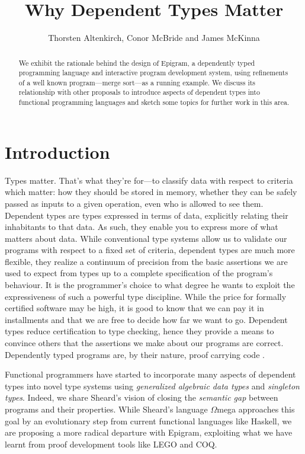 \documentclass{fundam}
\begin{document}
\title{Why Dependent Types Matter}
\author{Thorsten Altenkirch, Conor McBride and James McKinna}
\maketitle

\begin{abstract}
  We exhibit the rationale behind the design of Epigram, a dependently
  typed programming language and interactive program development
  system, using refinements of a well known program---merge sort---as a
  running example. We discuss its relationship with other proposals
  to introduce aspects of dependent types into functional programming
  languages and sketch some topics for further work in this area.
\end{abstract}

\section{Introduction}

Types matter. That's what they're for---to classify data with respect
to criteria which matter: how they should be stored in memory, whether
they can be safely passed as inputs to a given operation, even who is
allowed to see them. Dependent types are types expressed in terms of
data, explicitly relating their inhabitants to that data. As such,
they enable you to express more of what matters about data.  While
conventional type systems allow us to validate our programs with
respect to a fixed set of criteria, dependent types are much more
flexible, they realize a continuum of precision from the basic
assertions we are used to expect from types up to a complete
specification of the program's behaviour. It is the programmer's
choice to what degree he wants to exploit the expressiveness of such a
powerful type discipline. While the price for formally certified
software may be high, it is good to know that we can pay it in
installments and that we are free to decide how far we want to go.
Dependent types reduce certification to type checking, hence they
provide a means to convince others that the assertions we make about
our programs are correct. Dependently typed programs are, by their
nature, proof carrying code \cite{necula1996,hamid03:safpcc}.


Functional programmers have started to incorporate many aspects of
dependent types into novel type systems using \emph{generalized
  algebraic data types} and \emph{singleton types}. Indeed, we share
Sheard's vision \cite{sheard-04} of closing the \emph{semantic gap}
between programs and their properties.
While Sheard's language $\Omega$mega approaches this goal by an
evolutionary step from current functional languages like Haskell, we
are proposing a more radical departure with Epigram, exploiting what
we have learnt from proof development tools like LEGO and COQ.
\end{document}
